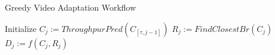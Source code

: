 \begin{algorithm}[h]
\caption{Greedy Video Adaptation Workflow}
\label{alg:greedy-vbr}
\begin{algorithmic}[1]
\State Initialize
\State $C_j := ThroughpurPred(C_{[\tau,j-1]})$
\State $R_j := FindClosestBr(C_j)$
\State $D_j := f(C_j, R_j)$
\EndFor
\end{algorithmic}
\end{algorithm} 